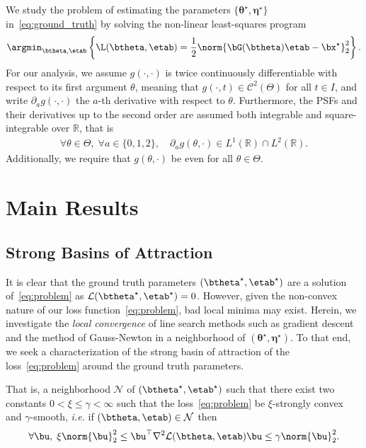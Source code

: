 \documentclass[conference,english,final,svgnames]{IEEEtran}
\begin{document}
We study the problem of estimating the parameters $\{\bm{\theta}^\star, \bm{\eta}^\star\}$ in~\eqref{eq:ground_truth} by solving the non-linear least-squares program
\begin{align}
    \label{eq:problem}
    \argmin_{\btheta, \etab} \left\{ \L(\btheta, \etab) = \frac{1}{2}\norm{\bG(\btheta)\etab- \bx^{\star}}_2^2 \right\}.
\end{align}
 For our analysis, we assume $g(\cdot, \cdot)$ is twice continuously differentiable with respect to its first argument $\theta$, meaning that $g(\cdot, t) \in \mathcal{C}^2(\Theta)$ for all $t \in I$, and write $\partial_a g(\cdot, \cdot)$ the $a$-th derivative with respect to $\theta$. Furthermore, the PSFs and their derivatives up to the second order are assumed both integrable and square-integrable over $\mathbb{R}$, that is
\begin{align}
     \forall \theta \in \Theta,\; \forall a \in \{0,1,2\} ,\quad \partial_a g(\theta, \cdot) \in L^1(\mathbb{R}) \cap L^2(\mathbb{R}).
\end{align}
 Additionally, we require that $g(\theta, \cdot)$ be even for all $\theta \in \Theta$.

\section{Main Results}\label{sec:main_results}

\subsection{Strong Basins of Attraction}

It is clear that the ground truth parameters $(\btheta^\star, \etab^\star)$ are a solution of~\eqref{eq:problem} as $\mathcal{L}(\btheta^\star, \etab^\star) = 0$. However, given the non-convex nature of our loss function~\eqref{eq:problem}, bad local minima may exist. Herein, we investigate the \emph{local convergence} of line search methods such as gradient descent and the method of Gauss-Newton in a neighborhood of $(\bm{\theta}^\star, \bm{\eta}^\star)$. To that end, we seek a characterization of the strong basin of attraction of the loss~\eqref{eq:problem} around the ground truth parameters.

That is, a neighborhood $\mathcal{N}$ of $(\btheta^\star, \etab^\star)$ such that there exist two constants $0 < \xi \leq \gamma < \infty$ such that the loss~\eqref{eq:problem}  be $\xi$-strongly convex and $\gamma$-smooth, \emph{i.e.} if $(\btheta, \etab) \in \mathcal{N}$ then
\begin{align}
    \label{eq:min-eigval}
     \forall \bu, \; \xi \norm{\bu}_2^2 \leq \bu^{\top} \nabla^2 \mathcal{L}(\btheta, \etab)\bu \leq  \gamma \norm{\bu}_2^2.
\end{align}
\end{document}
